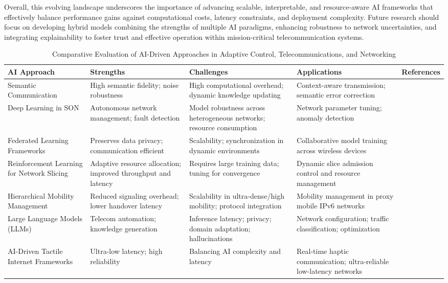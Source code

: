 \documentclass[sigconf]{acmart}
\begin{document}
Overall, this evolving landscape underscores the importance of advancing scalable, interpretable, and resource-aware AI frameworks that effectively balance performance gains against computational costs, latency constraints, and deployment complexity. Future research should focus on developing hybrid models combining the strengths of multiple AI paradigms, enhancing robustness to network uncertainties, and integrating explainability to foster trust and effective operation within mission-critical telecommunication systems.

\begin{table*}[htbp]
\centering
\caption{Comparative Evaluation of AI-Driven Approaches in Adaptive Control, Telecommunications, and Networking}
\label{tab:ai_approaches_comparison}
\begin{adjustbox}{max width=\textwidth}
\begin{tabular}{@{}lllll@{}}
\toprule
\textbf{AI Approach} & \textbf{Strengths} & \textbf{Challenges} & \textbf{Applications} & \textbf{References} \\ \midrule
Semantic Communication & High semantic fidelity; noise robustness & High computational overhead; dynamic knowledge updating & Context-aware transmission; semantic error correction & \cite{ref1} \\
Deep Learning in SON & Autonomous network management; fault detection & Model robustness across heterogeneous networks; resource consumption & Network parameter tuning; anomaly detection & \cite{ref2} \\
Federated Learning Frameworks & Preserves data privacy; communication efficient & Scalability; synchronization in dynamic environments & Collaborative model training across wireless devices & \cite{ref4,ref5} \\
Reinforcement Learning for Network Slicing & Adaptive resource allocation; improved throughput and latency & Requires large training data; tuning for convergence & Dynamic slice admission control and resource management & \cite{ref6} \\
Hierarchical Mobility Management & Reduced signaling overhead; lower handover latency & Scalability in ultra-dense/high mobility; protocol integration & Mobility management in proxy mobile IPv6 networks & \cite{ref19} \\
Large Language Models (LLMs) & Telecom automation; knowledge generation & Inference latency; privacy; domain adaptation; hallucinations & Network configuration; traffic classification; optimization & \cite{ref7} \\
AI-Driven Tactile Internet Frameworks & Ultra-low latency; high reliability & Balancing AI complexity and latency & Real-time haptic communication; ultra-reliable low-latency networks & \cite{ref10} \\ \bottomrule
\end{tabular}
\end{adjustbox}
\end{table*}
\end{document}
